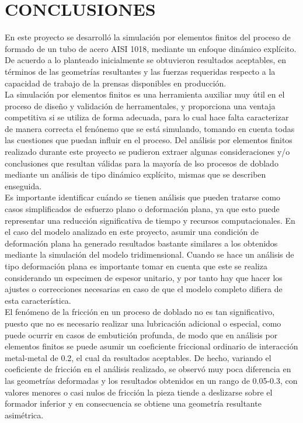 \chapter*{CONCLUSIONES}


En este proyecto se desarrolló la simulación por elementos finitos del proceso de formado 
de un tubo de acero AISI 1018, mediante un enfoque dinámico explícito. De acuerdo a lo 
planteado inicialmente se obtuvieron resultados aceptables, en términos de las geometrías 
resultantes y las fuerzas requeridas respecto a la capacidad de trabajo de la prensas 
disponibles en producción.\\

La simulación por elementos finitos es una herramienta auxiliar muy útil en el proceso de 
diseño y validación de herramentales, y proporciona una ventaja competitiva si se utiliza 
de forma adecuada, para lo cual hace falta caracterizar de manera correcta el fenónemo 
que se está simulando, tomando en cuenta todas las cuestiones que puedan influir 
en el proceso. Del análisis por elementos finitos realizado durante este proyecto 
se pudieron extraer algunas consideraciones y/o conclusiones que resultan válidas 
para la mayoría de lso procesos de doblado mediante un análisis de tipo dinámico explícito, mismas 
que se describen enseguida.\\

Es importante identificar cuándo se tienen análisis que pueden tratarse como casos simplificados 
de esfuerzo plano o deformación plana, ya que esto puede representar una reducción significativa 
de tiempo y recursos computacionales. En el caso del modelo analizado en este proyecto, asumir 
una condición de deformación plana ha generado resultados bastante similares a los obtenidos 
mediante la simulación del modelo tridimensional. Cuando se hace un análisis de tipo 
deformación plana es importante tomar en cuenta que este se realiza considerando un especimen 
de espesor unitario, y por tanto hay que hacer los ajustes o correcciones necesarias en 
caso de que el modelo completo difiera de esta característica. \\

El fenómeno de la fricción en un proceso de doblado no es tan significativo, puesto que no 
es necesario realizar una lubricación adicional o especial, como puede ocurrir en casos 
de embutición profunda, de modo que en análisis por elementos finitos se puede asumir 
un coeficiente friccional ordinario de interacción metal-metal de 0.2, el cual da resultados 
aceptables. De hecho, variando el coeficiente de fricción en el análisis realizado, se observó 
muy poca diferencia en las geometrías deformadas y los resultados obtenidos en un rango de 0.05-0.3, 
con valores menores o casi nulos de fricción la pieza tiende a deslizarse sobre el formador 
inferior y en consecuencia se obtiene una geometría resultante asimétrica.\\

